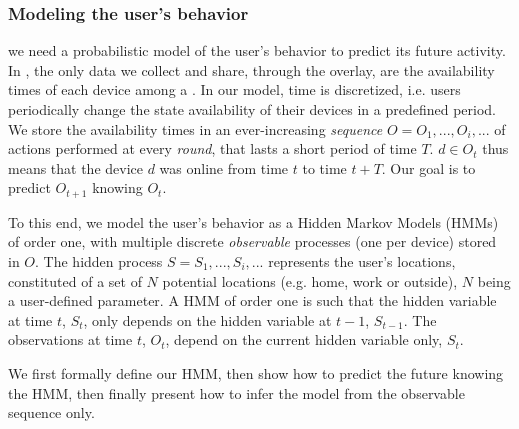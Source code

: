 \subsubsection{Modeling the user's behavior}
\label{sub:a_model_of_the_user_s_behavior}

we need a probabilistic model of the user's behavior to predict its future activity.
In \name, the only data we collect and share, through the \squad overlay, are the availability times of each device among a \squad.
In our model, time is discretized, i.e. users periodically change the state availability of their devices in a predefined period.
We store the availability times in an ever-increasing \emph{sequence} $O=O_1, ..., O_i, ...$ of actions performed at every \emph{round}, that lasts a short period of time $T$. 
$d \in O_t$ thus means that the device $d$ was online from time $t$ to time $t+T$.
Our goal is to predict $O_{t+1}$ knowing $O_t$.

To this end, we model the user's behavior as a Hidden Markov Models (HMMs) of order one, with multiple discrete \emph{observable} processes (one per device) stored in $O$. 
The hidden process $S=S_1, ..., S_i, ...$ represents the user's locations, constituted of a set of $N$ potential locations (e.g. home, work or outside), $N$ being a user-defined parameter.
A HMM of order one is such that the hidden variable at time $t$, $S_t$, only depends on the hidden variable at $t-1$, $S_{t-1}$.
The observations at time $t$, $O_t$, depend on the current hidden variable only, $S_t$.

We first formally define our HMM, then show how to predict the future knowing the HMM, then finally present how to infer the model from the observable sequence only.




